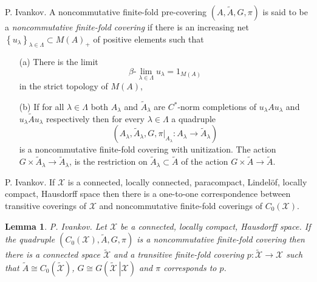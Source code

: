 \documentclass{beamer}
\theoremstyle{plain}
\newtheorem{lem}{Lemma}%
\newcommand{\sX}{\mathcal{X}}       %
\begin{document}
\begin{frame}
\begin{definition}
	\alert{P. Ivankov}.	A   noncommutative finite-fold  pre-covering $\left(A, \widetilde{A}, G, \pi \right)$ is said to be  a \textit{noncommutative finite-fold covering} if there is an increasing net $\left\{u_\lambda\right\}_{\lambda\in\Lambda}\subset M\left( A\right)_+ $  of positive elements such that
	\begin{enumerate}
		\item[(a)] There is the limit 
		$$
		\beta\text{-}\lim_{\lambda \in \Lambda} u_\lambda = 1_{M\left(A \right) }
		$$
		in the strict topology of $M\left(A \right)$,
		\item[(b)]  If for all   $\lambda\in\Lambda$ both $A_\lambda$ and  $\widetilde A_\lambda$ are $C^*$-norm completions  of $u_\lambda A u_\lambda$ and  $u_\lambda\widetilde{A}u_\lambda$ respectively then for every $\lambda\in\Lambda$ a quadruple
		$$
		\left(A_\lambda, \widetilde{A}_\lambda, G, \left.\pi\right|_{A_\lambda} :A_\lambda\to \widetilde{A}_\lambda\right)	
		$$
		is a noncommutative finite-fold covering with unitization. The action 	$G \times \widetilde{A}_\lambda\to \widetilde{A}_\lambda$, is the restriction on $\widetilde{A}_\lambda\subset \widetilde{   A}$ of the action $G\times  \widetilde{A}\to \widetilde{A}$.
	\end{enumerate}
	
\end{definition}
\end{frame}
\begin{frame}

\begin{theorem}
	\alert{P. Ivankov}. 
If $\mathcal X$ is a connected, locally connected, paracompact, Lindel\"{o}f, locally compact, Hausdorff space then there is a one-to-one correspondence between transitive coverings of  $\mathcal X$ and noncommutative finite-fold coverings of $C_0\left( \mathcal X\right)$. 
\end{theorem}

	\begin{lem}
		\alert{P. Ivankov}. 	Let $\mathcal X$ be a connected, locally compact, Hausdorff space.
		If the  quadruple $\left(C_0\left(\mathcal  X \right), \widetilde{A}, G,    \pi\right)$ is a noncommutative finite-fold covering then there is a connected space $\widetilde{   \mathcal X }$ and a transitive finite-fold covering  $p: \widetilde{   \mathcal X } \to \sX$ such that $\widetilde{A} \cong C_0\left( \widetilde{   \mathcal X }\right)$, $G \cong G\left(\left. \widetilde{   \mathcal X } ~\right| {   \mathcal X }\right)$ and $\pi$ corresponds to $p$.
	\end{lem}
\end{frame}
\end{document}
